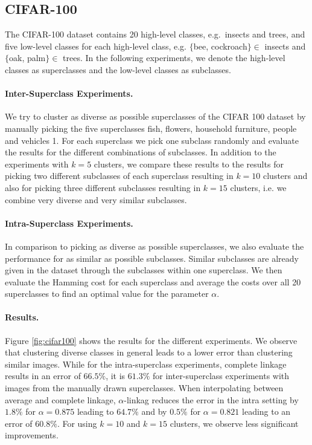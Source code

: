 \subsection{CIFAR-100}

The CIFAR-100 dataset contains 20 high-level classes, e.g.\ insects and trees, and five low-level classes for each high-level class, e.g. $\{$bee, cockroach$\} \in$ insects and $\{$oak, palm$\} \in$ trees. In the following experiments, we denote the high-level classes as superclasses and the low-level classes as subclasses.

\paragraph{Inter-Superclass Experiments.} We try to cluster as diverse as possible superclasses of the CIFAR 100 dataset by manually picking the five superclasses fish, flowers, household furniture, people and vehicles 1. For each superclass we pick one subclass randomly and evaluate the results for the different combinations of subclasses. In addition to the experiments with $k = 5$ clusters, we compare these results to the results for picking two different subclasses of each superclass resulting in $k = 10$ clusters and also for picking three different subclasses resulting in $k = 15$ clusters, i.e. we combine very diverse and very similar subclasses.

\paragraph{Intra-Superclass Experiments.} In comparison to picking as diverse as possible superclasses, we also evaluate the performance for as similar as possible subclasses. Similar subclasses are already given in the dataset through the subclasses within one superclass. We then evaluate the Hamming cost for each superclass and average the costs over all 20 superclasses to find an optimal value for the parameter $\alpha$. 

\paragraph{Results.} Figure \ref{fig:cifar100} shows the results for the different experiments. We observe that clustering diverse classes in general leads to a lower error than clustering similar images. While for the intra-superclass experiments, complete linkage results in an error of $66.5\%$, it is $61.3\%$ for inter-superclass experiments with images from the manually drawn superclasses. When interpolating between average and complete linkage, $\alpha$-linkag reduces the error in the intra setting by $1.8\%$ for $\alpha = 0.875$ leading to $64.7\%$ and by $0.5\%$ for $\alpha = 0.821$ leading to an error of $60.8\%$. For using $k = 10$ and $k = 15$ clusters, we observe less significant improvements.

